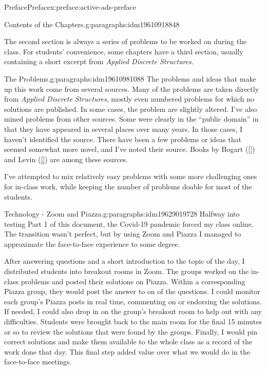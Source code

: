 \documentclass[oneside,10pt,]{book}
\newcommand{\xreffont}{\relax}
\numberwithin{equation}{section}
\begin{document}
\begin{preface}{Preface}{}{Preface}{}{}{x:preface:active-ads-preface}
\begin{paragraphs}{Contents of the Chapters.}{g:paragraphs:idm19610918848}
\par
The second section is always a series of problems to be worked on during the class. For students' convenience, some chapters have a third section, usually containing a short excerpt from \emph{Applied Discrete Structures}.%
\end{paragraphs}%
\begin{paragraphs}{The Problems.}{g:paragraphs:idm19610981088}%
The problems and ideas that make up this work come from several sources.  Many of the problems are taken directly from \emph{Applied Discrete Structures}, mostly even numbered problems for which no solutions are published. In some cases, the problem are slightly altered.  I've also mined problems from other sources.  Some were clearly in the ``public domain'' in that they have appeared in several places over many years.  In those cases, I haven't identified the source.   There have been a few problems or ideas that seemed somewhat more novel, and I've noted their source. Books by Bogart (\hyperlink{x:biblio:biblio-bogart-2017}{[{\xreffont 1}]}) and Levin (\hyperlink{x:biblio:biblio-levin-2020}{[{\xreffont 3}]}) are among these sources.%
\par
I've attempted to mix relatively easy problems with some more challenging ones for in-class work, while keeping the number of problems doable for most of the students.%
\end{paragraphs}%
\begin{paragraphs}{Technology - Zoom and Piazza.}{g:paragraphs:idm19629019728}%
Halfway into testing Part 1 of this document, the Covid-19 pandemic forced my class online. The transition wasn't perfect, but by using Zoom and Piazza I managed to approximate the face-to-face experience to some degree.%
\par
After answering questions and a short introduction to the topic of the day, I distributed students into breakout rooms in Zoom.  The groups worked on the in-class problems and posted their solutions on Piazza.  Within a corresponding Piazza group, they would post the answer to on of the questions.  I could monitor each group's Piazza posts in real time, commenting on or endorsing the solutions.  If needed, I could also drop in on the group's breakout room to help out with any difficulties. Students were brought back to the main room for the final 15 minutes or so to review the solutions that were found by the groups.  Finally, I would pin correct solutions and make them available to the whole class as a record of the work done that day. This final step added value over what we would do in the face-to-face meetings.%

\end{paragraphs}
\end{preface}
\end{document}
